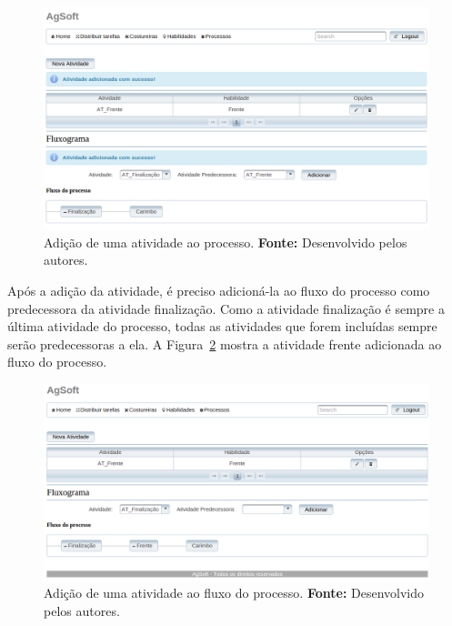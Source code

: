 \begin{figure}[h!]
	\centerline{\includegraphics[width=14.7cm]{./imagens/adiconar_atividade_frente_teste5.png}}
	\caption[Adição de uma atividade ao processo.]
	{Adição de uma atividade ao processo. \textbf{Fonte:} Desenvolvido pelos
	autores.}
	\label{fig:add_frente_teste5}
\end{figure}

\par Após a adição da atividade, é preciso adicioná-la ao fluxo do processo como
predecessora da atividade finalização. Como a atividade finalização é sempre a
última atividade do processo, todas as atividades que forem incluídas sempre
serão predecessoras a ela. A Figura~\ref{fig:add_frente_teste4} mostra a atividade frente adicionada
ao fluxo do processo.

\newpage

\begin{figure}[h!]
	\centerline{\includegraphics[width=14.7cm]{./imagens/adicionar_atividade_frente_teste4.png}}
	\caption[Adição de uma atividade ao fluxo do processo.]
	{Adição de uma atividade ao fluxo do processo. \textbf{Fonte:} Desenvolvido
	pelos autores.}
	\label{fig:add_frente_teste4}
\end{figure}


